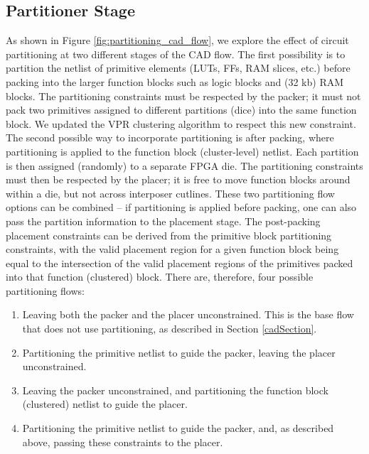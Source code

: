 \subsection{Partitioner Stage}\label{sec:partitioner_stage}
As shown in Figure \ref{fig:partitioning_cad_flow}, we explore the effect of circuit partitioning at two different stages of the CAD flow. The first possibility is to partition the netlist of primitive elements (LUTs, FFs, RAM slices, etc.) before packing into the larger function blocks such as logic blocks and (32 kb) RAM blocks. The partitioning constraints must be respected by the packer; it must not pack two primitives assigned to different partitions (dice) into the same function block. We updated the VPR clustering algorithm to respect this new constraint. The second possible way to incorporate partitioning is after packing, where partitioning is applied to the function block (cluster-level) netlist. Each partition is then assigned (randomly) to a separate FPGA die. The partitioning constraints must then be respected by the placer; it is free to move function blocks around within a die, but not across interposer cutlines. These two partitioning flow options can be combined -- if partitioning is applied before packing, one can also pass the partition information to the placement stage. The post-packing placement constraints can be derived from the primitive block partitioning constraints, with the valid placement region for a given function block being equal to the intersection of the valid placement regions of the primitives packed into that function (clustered) block. There are, therefore, four possible partitioning flows:

\begin{enumerate}[label=(\roman*)]
  \item Leaving both the packer and the placer unconstrained. This is the base flow that does not use partitioning, as described in Section \ref{cadSection}.
  \item Partitioning the primitive netlist to guide the packer, leaving the placer unconstrained.
  \item Leaving the packer unconstrained, and partitioning the function block (clustered) netlist to guide the placer.
  \item Partitioning the primitive netlist to guide the packer, and, as described above, passing these constraints to the placer.
\end{enumerate}

